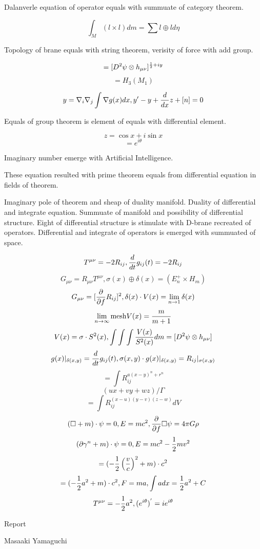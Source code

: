 \documentclass{jsarticle}
\begin{document}
  Dalanverle equation of operator equals with summuate of category theorem.

  $$ \int_M (l \times l) dm = \sum l \oplus l d \eta $$

  Topology of brane equals with string theorem, verisity of force with add group.

  $$ = [D^2 \psi \otimes h_{\mu\nu}]^{{1 \over 2} + iy} $$
  $$ = H_3(M_1) $$

  $$ y = \nabla_{i}\nabla_{j} \int \nabla g(x)dx, y' - y + {d \over dx}z + [n] = 0 $$

  Equals of group theorem is element of equals with differential element.

  $$ z = \cos x + i \sin x $$
  $$ = e^{i \theta} $$

  Imaginary number emerge with Artificial Intelligence.

  These equation resulted with prime theorem equals from differential equation in fields of theorem.

  Imaginary pole of theorem and sheap of duality manifold. Duality of differential and integrate equation.
  Summuate of manifold and possibility of differential structure.
  Eight of differential structure is stimulate with D-brane recreated of operators.
  Differential and integrate of operators is emerged with summuated of space.

  $$ T^{\mu\nu} = - 2 R_{ij}, {d \over dt}g_{ij}(t) = - 2 R_{ij} $$
  $$ G_{\mu\nu} = R_{\mu\nu}T^{\mu\nu}, \sigma(x) \oplus \delta(x) = (E^{+}_{n} \times H_m) $$
  $$ G_{\mu\nu} = [{\partial \over \partial f}R_{ij}]^{2}, \delta(x)\cdot V(x) = \lim_{n \to 1}\delta(x) $$
  $$ \lim_{n \to \infty} \mathrm{mesh} V(x) = {m \over m + 1} $$
  $$ V(x) = \sigma \cdot S^2(x), \int \int \int{V(x) \over S^2(x)}dm = [D^2 \psi \otimes h_{\mu\nu}] $$
  $$ g(x)|_{\delta(x,y)} = {d \over dt}g_{ij}(t), \sigma(x,y)\cdot g(x)|_{\delta(x,y)} = R_{ij}|_{\sigma(x,y)} $$
  $$ = \int R^{a(x - y)^n + r^n}_{ij} $$
  $$ (ux + vy + wz) / \Gamma $$
  $$ = \int R_{ij}^{(x - u)(y - v)(z - w)} dV $$
  $$ (\square + m)\cdot \psi = 0, E = mc^2, {\partial \over \partial f}\square \psi = 4 \pi G \rho $$
  $$ (\partial \gamma^n + m)\cdot \psi = 0, E = mc^2 - {1 \over 2}mv^2 $$
  $$ = (- {1 \over 2}\left({v \over c}\right)^2 + m)\cdot c^2 $$
  $$ = (- {1 \over 2}a^2 + m)\cdot c^2, F = ma, \int a dx = {1 \over 2}a^2 + C $$
  $$ T^{\mu\nu} = -{1 \over 2}a^2, (e^{i \theta})^{'} = i e^{i \theta} $$
	
\newpage
\begin{center}
\large	Report
\end{center}
\begin{center}Masaaki Yamaguchi
\end{center}
\end{document}
